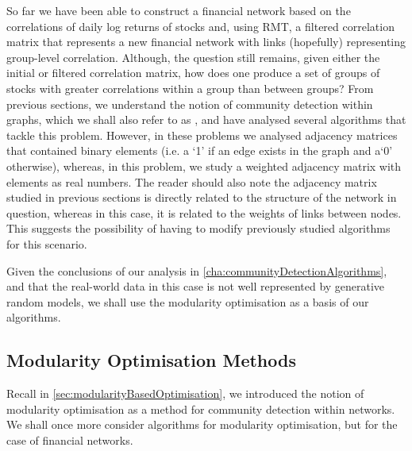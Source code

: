 So far we have been able to construct a financial network based on the correlations of daily log returns of stocks and, using RMT, a filtered correlation matrix that represents a new financial network with links (hopefully) representing group-level correlation.
Although, the question still remains, given either the initial or filtered correlation matrix, how does one produce a set of groups of stocks with greater correlations within a group than between groups?
From previous sections, we understand the notion of community detection within graphs, which we shall also refer to as , and have analysed several algorithms that tackle this problem. However, in these problems we analysed adjacency matrices that contained binary elements (i.e. a `1' if an edge exists in the graph and a`0' otherwise), whereas, in this problem, we study a weighted adjacency matrix with elements as real numbers.
The reader should also note the adjacency matrix studied in previous sections is directly related to the structure of the network in question, whereas in this case, it is related to the weights of links between nodes.
This suggests the possibility of having to modify previously studied algorithms for this scenario.

Given the conclusions of our analysis in \cref{cha:communityDetectionAlgorithms}, and that the real-world data in this case is not well represented by generative random models, we shall use the modularity optimisation as a basis of our algorithms.


\subsection{Modularity Optimisation Methods}
\label{subsec:modularityOptimisationMethods}

Recall in \cref{sec:modularityBasedOptimisation}, we introduced the notion of modularity optimisation as a method for community detection within networks. We shall once more consider algorithms for modularity optimisation, but for the case of financial networks.

